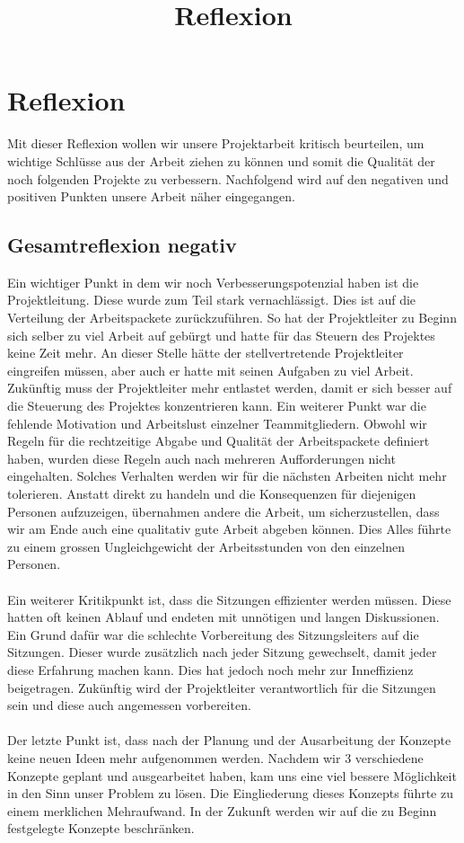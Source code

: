 \documentclass[12pt]{article}
\title{Reflexion}
\begin{document}
\section{Reflexion}

Mit dieser Reflexion wollen wir unsere Projektarbeit kritisch beurteilen, um wichtige Schlüsse aus der Arbeit ziehen zu können und somit die Qualität der noch folgenden Projekte zu verbessern.  Nachfolgend wird auf den negativen und positiven Punkten unsere Arbeit näher eingegangen.
\bigskip

\subsection{Gesamtreflexion negativ}

Ein wichtiger Punkt in dem wir noch Verbesserungspotenzial haben ist die Projektleitung. Diese wurde zum Teil stark vernachlässigt. Dies ist auf die Verteilung der Arbeitspackete zurückzuführen. So hat der Projektleiter zu Beginn sich selber zu viel Arbeit auf gebürgt und hatte für das Steuern des Projektes keine Zeit mehr. An dieser Stelle hätte der stellvertretende Projektleiter eingreifen müssen, aber auch er hatte mit seinen Aufgaben zu viel Arbeit. Zukünftig muss der Projektleiter mehr entlastet werden, damit er sich besser auf die Steuerung des Projektes konzentrieren kann. Ein weiterer Punkt war die fehlende Motivation und Arbeitslust einzelner Teammitgliedern. Obwohl wir Regeln für die rechtzeitige Abgabe und Qualität der Arbeitspackete definiert haben, wurden diese Regeln auch nach mehreren Aufforderungen nicht eingehalten. Solches Verhalten werden wir für die nächsten Arbeiten nicht mehr tolerieren. Anstatt direkt zu handeln und die Konsequenzen für diejenigen Personen aufzuzeigen, übernahmen andere die Arbeit, um sicherzustellen, dass wir am Ende auch eine qualitativ gute Arbeit abgeben können. Dies Alles führte zu einem grossen Ungleichgewicht der Arbeitsstunden von den einzelnen Personen. 
\\
\\
Ein weiterer Kritikpunkt ist, dass die Sitzungen effizienter werden müssen. Diese hatten oft keinen Ablauf und endeten mit unnötigen und langen Diskussionen. Ein Grund dafür war die schlechte Vorbereitung des Sitzungsleiters auf die Sitzungen. Dieser wurde zusätzlich nach jeder Sitzung gewechselt, damit jeder diese Erfahrung machen kann. Dies hat jedoch noch mehr zur Inneffizienz beigetragen. Zukünftig wird der Projektleiter verantwortlich für die Sitzungen sein und diese auch angemessen vorbereiten.
\\
\\
Der letzte Punkt ist, dass nach der Planung und der Ausarbeitung der Konzepte keine neuen Ideen mehr aufgenommen werden. Nachdem wir 3 verschiedene Konzepte geplant und ausgearbeitet haben, kam uns eine viel bessere Möglichkeit in den Sinn unser Problem zu lösen. Die Eingliederung dieses Konzepts führte zu einem merklichen Mehraufwand. In der Zukunft werden wir auf die zu Beginn festgelegte Konzepte beschränken.
\bigskip
\end{document}
